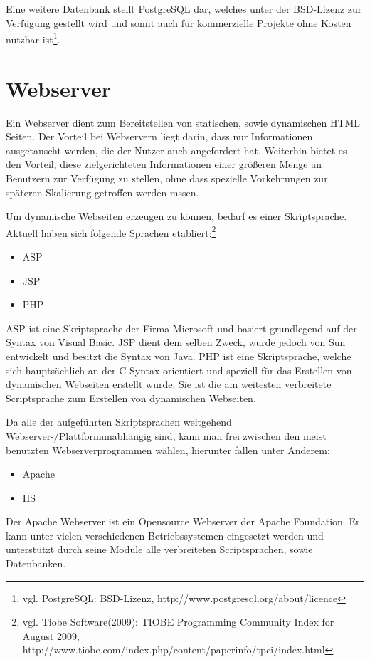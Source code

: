 Eine weitere Datenbank stellt PostgreSQL dar, welches unter der BSD-Lizenz zur Verfügung gestellt wird und somit auch für kommerzielle Projekte ohne Kosten nutzbar ist\footnote{vgl. PostgreSQL: BSD-Lizenz, http://www.postgresql.org/about/licence}.


\section{Webserver}
\label{sec:websrv}

Ein Webserver dient zum Bereitstellen von statischen, sowie dynamischen HTML Seiten.
Der Vorteil bei Webservern liegt darin, dass nur Informationen ausgetauscht werden, die der Nutzer auch angefordert hat.
Weiterhin bietet es den Vorteil, diese zielgerichteten Informationen einer größeren Menge an Benutzern zur Verfügung zu stellen, ohne dass spezielle Vorkehrungen zur späteren Skalierung getroffen werden mssen.

Um dynamische Webseiten erzeugen zu können, bedarf es einer Skriptsprache.
Aktuell haben sich folgende Sprachen etabliert:\footnote{vgl. Tiobe Software(2009): TIOBE Programming Community Index for August 2009, http://www.tiobe.com/index.php/content/paperinfo/tpci/index.html}

\begin{itemize}
\item ASP
\item JSP
\item PHP
\end{itemize}

ASP ist eine Skriptsprache der Firma Microsoft und basiert grundlegend auf der Syntax von Visual Basic.
JSP dient dem selben Zweck, wurde jedoch von Sun entwickelt und besitzt die Syntax von Java.
PHP ist eine Skriptsprache, welche sich hauptsächlich an der C Syntax orientiert und speziell für das Erstellen von
dynamischen Webseiten erstellt wurde. Sie ist die am weitesten verbreitete Scriptsprache zum Erstellen von dynamischen Webseiten.

Da alle der aufgeführten Skriptsprachen weitgehend Webserver-/Plattformunabhängig sind, kann man frei zwischen den meist benutzten Webserverprogrammen wählen, hierunter fallen unter Anderem:


\begin{itemize}
\item Apache
\item IIS
\end{itemize}

Der Apache Webserver ist ein Opensource Webserver der Apache Foundation.
Er kann unter vielen verschiedenen Betriebssystemen eingesetzt werden und unterstützt durch seine Module alle verbreiteten Scriptsprachen, sowie Datenbanken.

